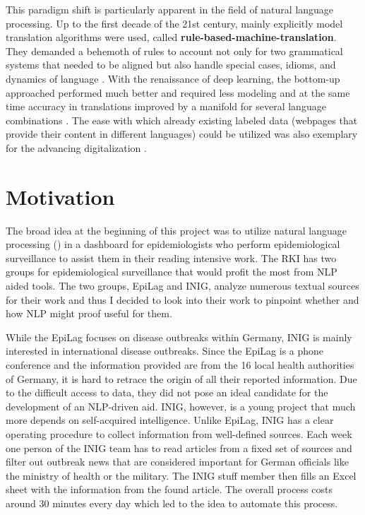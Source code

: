 This paradigm shift is particularly apparent in the field of natural language processing.
Up to the first decade of the 21st century, mainly explicitly model translation algorithms were used, called \textbf{rule-based-machine-translation}.
They demanded a behemoth of rules to account not only for two grammatical systems that needed to be aligned but also handle special cases, idioms, and dynamics of language \citep{Bar-Hillel1953, Bar-Hillel1960}.
With the renaissance of deep learning, the bottom-up approached performed much better and required less modeling and at the same time accuracy in translations improved by a manifold for several language combinations \citep{Bengio2003}.
The ease with which already existing labeled data (webpages that provide their content in different languages) could be utilized was also exemplary for the advancing digitalization \citep{Macklovitch00}.

\section{Motivation}
The broad idea at the beginning of this project was to utilize natural language
processing () in a dashboard for epidemiologists who perform epidemiological
surveillance to assist them in their reading intensive work.
The RKI has two groups for epidemiological surveillance that would profit the most from NLP aided tools. The two groups, EpiLag and INIG, analyze numerous textual sources for their work and thus I decided to look into their work to pinpoint whether and how NLP might proof useful for them.

While the EpiLag focuses on disease outbreaks within Germany, INIG is mainly interested in international disease outbreaks. Since the EpiLag is a phone conference and the information provided are from the 16 local health authorities of Germany, it is hard to retrace the origin of all their reported information.
Due to the difficult access to data, they did not pose an ideal candidate for the development of an NLP-driven aid.
INIG, however, is a young project that much more depends on self-acquired intelligence.
Unlike EpiLag, INIG has a clear operating procedure to collect information from well-defined sources.
Each week one person of the INIG team has to read articles from a fixed set of sources and filter out outbreak news that are considered important for German officials like the ministry of health or the military.
The INIG stuff member then fills an Excel sheet with the information from the found article.
The overall process costs around 30 minutes every day which led to the idea to automate this process.

